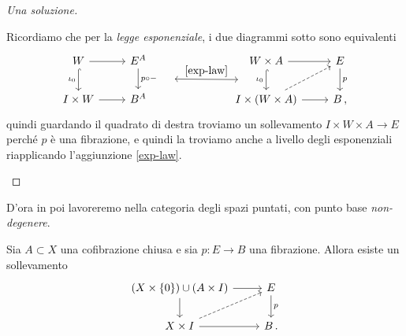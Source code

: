 \begin{exercise!}
\begin{proof}[Una soluzione]
\begin{rmnumerate}
			\addtocounter{enumi}{2}
			
			\item Ricordiamo che per la \emph{legge esponenziale}, 
			i due diagrammi sotto sono equivalenti
			\begin{equation*}
				\begin{tikzcd}
					W \ar[r] \ar[d, "\iota_{0}"', hook] & E^{A} \ar[d, "p \circ -"{name=S}] 
					& & & W \times A \ar[r] \ar[d, "\iota_{0}"'{name=E}, hook] & E \ar[d, "p"]\\
					I \times W \ar[r] & B^{A}
					& & & I \times (W \times A) \ar[r] \ar[ur, dashed] & B\,,
					\ar[from=S, to=E, shorten=14pt, "\eqref{exp-law}", leftrightarrow]
				\end{tikzcd}
			\end{equation*}
			quindi guardando il quadrato di destra troviamo un sollevamento 
			$I \times W \times A \to E$ perché
			$p$ è una fibrazione, e quindi la troviamo anche a livello degli esponenziali
			riapplicando l'aggiunzione \eqref{exp-law}.
		\end{rmnumerate}
	\end{proof}
\end{exercise!}

D'ora in poi lavoreremo nella categoria
degli spazi puntati, con punto base \emph{non-degenere}.
\begin{lemma}\label{relative-HLP}
	Sia $A \subset X$ una cofibrazione chiusa
	e sia $p:E \to B$ una fibrazione. Allora esiste un sollevamento
	\begin{equation*}
		\begin{tikzcd}
			(X \times \{0\}) \cup (A \times I) \ar[d] \ar[r] & E \ar[d, "p"] \\
			X \times I \ar[r] \ar[ur,dashed] & B\,.
		\end{tikzcd}
	\end{equation*}
\end{lemma}

